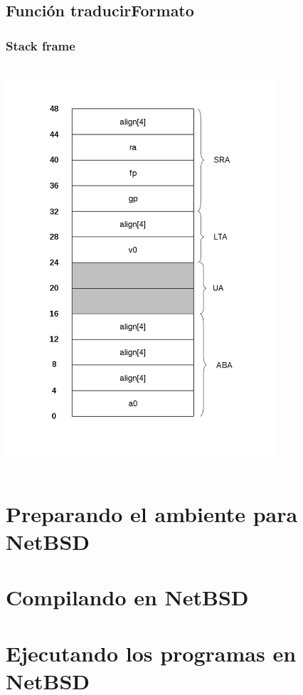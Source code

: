 \documentclass[a4paper,10pt]{article}
\begin{document}
  \subsection{Funci\'on traducirFormato}
    \subsubsection{Stack frame}
      \begin{center}
	\includegraphics[width=10cm, height=15cm]{DibujosStackFrame/stack-traducirFormato.jpg}
      \end{center}

 
\section{Preparando el ambiente para NetBSD}
 
\section{Compilando en NetBSD}

\section{Ejecutando los programas en NetBSD}
\end{document}

